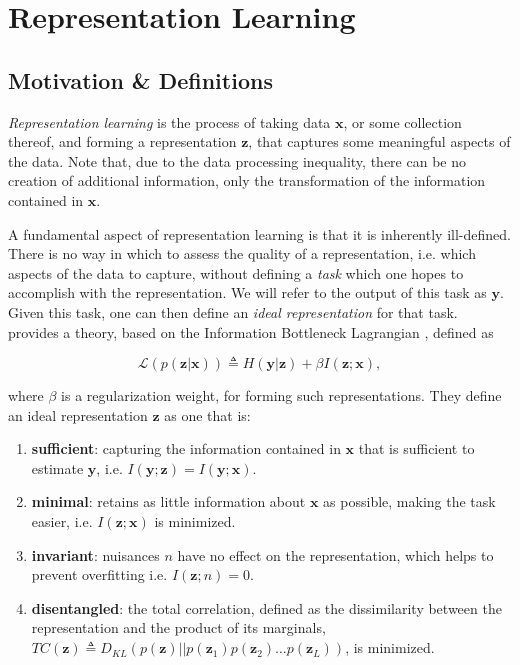 \chapter{Representation Learning}

\section{Motivation \& Definitions}

\textit{Representation learning} is the process of taking data $\mathbf{x}$, or some collection thereof, and forming a representation $\mathbf{z}$, that captures some meaningful aspects of the data. Note that, due to the data processing inequality, there can be no creation of additional information, only the transformation of the information contained in $\mathbf{x}$.

A fundamental aspect of representation learning is that it is inherently ill-defined. There is no way in which to assess the quality of a representation, i.e. which aspects of the data to capture, without defining a \textit{task} which one hopes to accomplish with the representation. We will refer to the output of this task as $\mathbf{y}$. Given this task, one can then define an \textit{ideal representation} for that task. \cite{achille2017emergence} provides a theory, based on the Information Bottleneck Lagrangian \cite{tishby2000information}, defined as

\begin{equation}
	\mathcal{L}(p(\mathbf{z} | \mathbf{x})) \triangleq H(\mathbf{y} | \mathbf{z}) + \beta I(\mathbf{z} ; \mathbf{x}),
\end{equation}

\noindent where $\beta$ is a regularization weight, for forming such representations. They define an ideal representation $\mathbf{z}$ as one that is:

\begin{enumerate}
	\item \textbf{sufficient}: capturing the information contained in $\mathbf{x}$ that is sufficient to estimate $\mathbf{y}$, i.e. $I(\mathbf{y}; \mathbf{z}) = I(\mathbf{y}; \mathbf{x})$.
	\item \textbf{minimal}: retains as little information about $\mathbf{x}$ as possible, making the task easier, i.e. $I(\mathbf{z}; \mathbf{x})$ is minimized.
	\item \textbf{invariant}: nuisances $n$ have no effect on the representation, which helps to prevent overfitting i.e. $I(\mathbf{z}; n) = 0$.
	\item \textbf{disentangled}: the total correlation, defined as the dissimilarity between the representation and the product of its marginals, $TC(\mathbf{z}) \triangleq D_{KL} (p(\mathbf{z}) || p(\mathbf{z}_1) p(\mathbf{z}_2) \dots p(\mathbf{z}_L))$, is minimized.
\end{enumerate}

